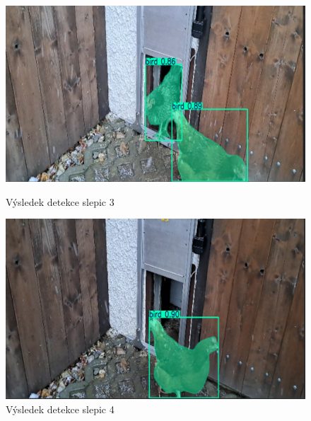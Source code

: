 \begin{figure}[htbp]
    \begin{minipage}[b]{0.45\textwidth}
        \centering
        \includegraphics[width=\textwidth]{img/chicken_detection3}
        \caption{Výsledek detekce slepic 3}
        \label{fig:chicken_detection3}
    \end{minipage}
    \hfill
    \begin{minipage}[b]{0.45\textwidth}
        \centering
        \includegraphics[width=\textwidth]{img/chicken_detection4}
        \caption{Výsledek detekce slepic 4}
        \label{fig:chicken_detection4}
    \end{minipage}
\end{figure}




